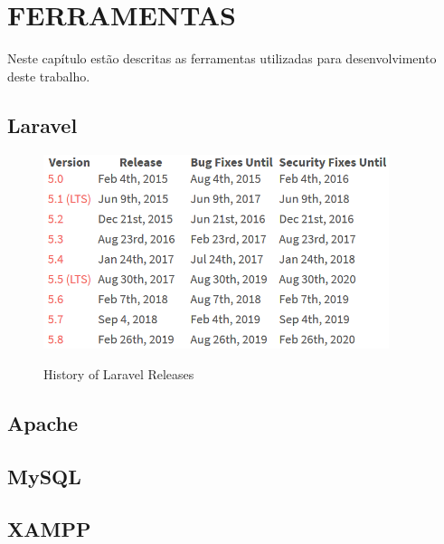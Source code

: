 
\chapter{FERRAMENTAS}
Neste capítulo estão descritas as ferramentas utilizadas para desenvolvimento deste
trabalho.


\section{Laravel} 

\begin{figure}[H]
    \centering
    \caption{History of Laravel Releases}
    \includegraphics[width=0.9\textwidth]{./dados/figuras/fig8}
    \label{fig:LaravelRelease}
\end{figure}


\section{Apache}

\section{MySQL}

\section{XAMPP}

